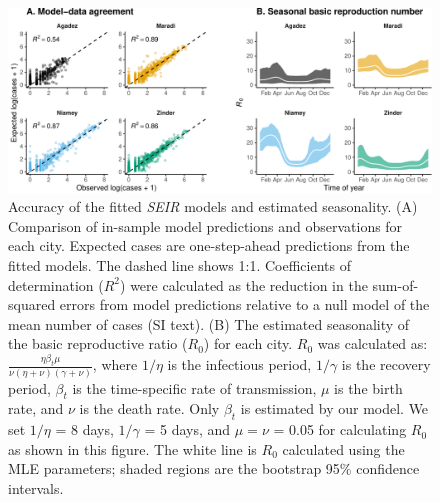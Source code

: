 \documentclass[3p]{elsarticle} %
\makeatletter
\def\maxwidth{\ifdim\Gin@nat@width>\linewidth\linewidth
\else\Gin@nat@width\fi}
\let\Oldincludegraphics\includegraphics
\renewcommand{\includegraphics}[1]{\Oldincludegraphics[width=\maxwidth]{#1}}
\makeatother
\begin{document}
\begin{figure}
\centering
\includegraphics{ms2_files/figure-latex/scatters-r0-1.pdf}
\caption{Accuracy of the fitted \emph{SEIR} models and estimated
seasonality. (A) Comparison of in-sample model predictions and
observations for each city. Expected cases are one-step-ahead
predictions from the fitted models. The dashed line shows 1:1.
Coefficients of determination (\(R^2\)) were calculated as the reduction
in the sum-of-squared errors from model predictions relative to a null
model of the mean number of cases (SI text). (B) The estimated
seasonality of the basic reproductive ratio (\(R_0\)) for each city.
\(R_0\) was calculated as:
\(\frac{\eta \beta_t \mu}{\nu(\eta+\nu)(\gamma+\nu)}\), where \(1/\eta\)
is the infectious period, \(1/\gamma\) is the recovery period,
\(\beta_t\) is the time-specific rate of transmission, \(\mu\) is the
birth rate, and \(\nu\) is the death rate. Only \(\beta_t\) is estimated
by our model. We set \(1/\eta\) = 8 days, \(1/\gamma\) = 5 days, and
\(\mu = \nu\) = 0.05 for calculating \(R_0\) as shown in this figure.
The white line is \(R_0\) calculated using the MLE parameters; shaded
regions are the bootstrap 95\% confidence intervals. \label{scatters}}
\end{figure}
\end{document}
